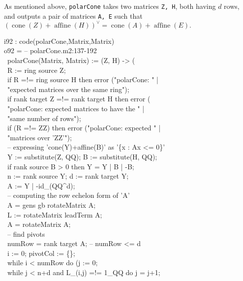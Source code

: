 \medskip
As mentioned above, {\tt polarCone} takes two matrices {\tt Z, H},
both having $d$ rows, and outputs a pair of matrices {\tt A, E} 
such that $(\operatorname{cone}(Z) + \operatorname{affine}(H))^\vee =
\operatorname{cone}(A) + \operatorname{affine}(E).$

\beginOutput
i92 : code(polarCone,Matrix,Matrix)\\
\emptyLine
o92 = -- polarCone.m2:137-192\\
\      polarCone(Matrix, Matrix) := (Z, H) -> (\\
\           R := ring source Z;\\
\           if R =!= ring source H then error ("polarCone: " | \\
\                "expected matrices over the same ring");\\
\           if rank target Z =!= rank target H then error (\\
\                "polarCone: expected matrices to have the " |\\
\                "same number of rows");     \\
\           if (R =!= ZZ) then error ("polarCone: expected " | \\
\                "matrices over 'ZZ'");\\
\           -- expressing 'cone(Y)+affine(B)' as '\{x : Ax <= 0\}'\\
\           Y := substitute(Z, QQ);     B := substitute(H, QQ);   \\
\           if rank source B > 0 then Y = Y | B | -B;\\
\           n := rank source Y;         d := rank target Y;     \\
\           A := Y | -id_(QQ^d);\\
\           -- computing the row echelon form of 'A'\\
\           A = gens gb rotateMatrix A;\\
\           L := rotateMatrix leadTerm A;\\
\           A = rotateMatrix A;\\
\           -- find pivots\\
\           numRow = rank target A;                  -- numRow <= d\\
\           i := 0;                     pivotCol := \{\};\\
\           while i < numRow do (j := 0;\\
\                while j < n+d and L_(i,j) =!= 1_QQ do j = j+1;\\
